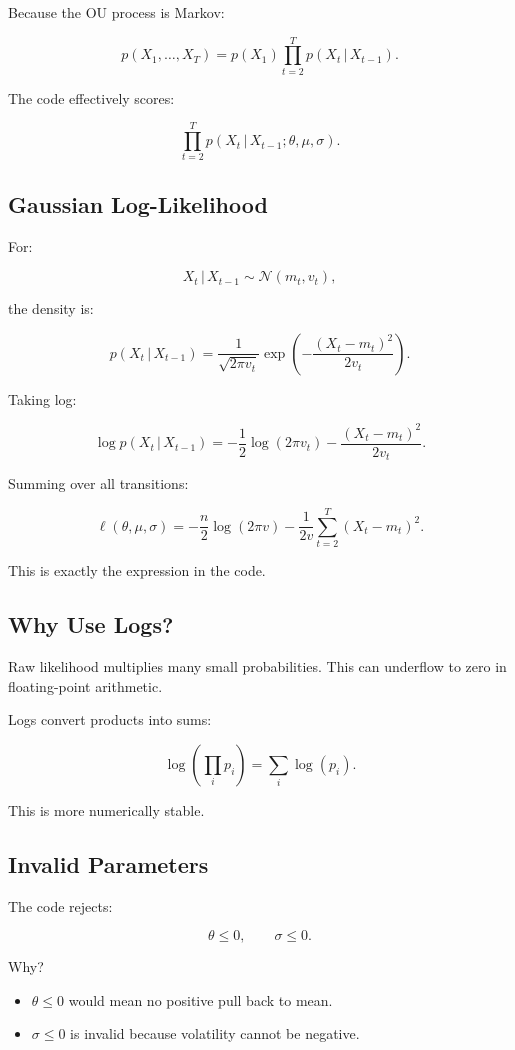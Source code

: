 \documentclass[11pt]{article}
\newcommand{\given}{\,|\,}
\newcommand{\Normal}{\mathcal{N}}
\begin{document}
Because the OU process is Markov:

\[
p(X_1,\dots,X_T)
= p(X_1)\prod_{t=2}^T p(X_t \given X_{t-1}).
\]

The code effectively scores:

\[
\prod_{t=2}^T p(X_t \given X_{t-1};\theta,\mu,\sigma).
\]

\subsection{Gaussian Log-Likelihood}

For:

\[
X_t \given X_{t-1} \sim \Normal(m_t,v_t),
\]

the density is:

\[
p(X_t\given X_{t-1})
=
\frac{1}{\sqrt{2\pi v_t}}
\exp\left(
-\frac{(X_t-m_t)^2}{2v_t}
\right).
\]

Taking log:

\[
\log p(X_t\given X_{t-1})
=
-\frac{1}{2}\log(2\pi v_t)
-\frac{(X_t-m_t)^2}{2v_t}.
\]

Summing over all transitions:

\[
\ell(\theta,\mu,\sigma)
=
-\frac{n}{2}\log(2\pi v)
-\frac{1}{2v}\sum_{t=2}^T (X_t-m_t)^2.
\]

This is exactly the expression in the code.

\subsection{Why Use Logs?}

Raw likelihood multiplies many small probabilities. This can underflow to zero
in floating-point arithmetic.

Logs convert products into sums:

\[
\log\left(\prod_i p_i\right) = \sum_i \log(p_i).
\]

This is more numerically stable.

\subsection{Invalid Parameters}

The code rejects:

\[
\theta \leq 0,\qquad \sigma \leq 0.
\]

Why?

\begin{itemize}
  \item $\theta \leq 0$ would mean no positive pull back to mean.
  \item $\sigma \leq 0$ is invalid because volatility cannot be negative.
\end{itemize}
\end{document}
